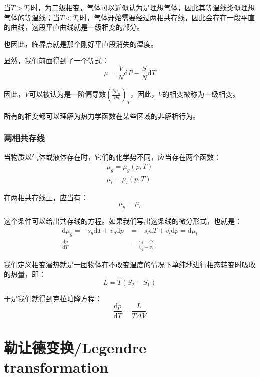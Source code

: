 \documentclass[a4paper, 10pt, openany]{book}%
\begin{document}
当$T>T_c$时，为二级相变，气体可以近似认为是理想气体，因此其等温线类似理想气体的等温线；当$T<T_c$时，气体开始需要经过两相共存线，因此会存在一段平直的曲线，这段平直曲线就是一级相变的部分。

也因此，临界点就是那个刚好平直段消失的温度。

显然，我们前面得到了一个等式：
\begin{equation}
  \mu=\frac{V}{N}\mathrm{d}P-\frac{S}{N}\mathrm{d}T\end{equation}

因此，$V$可以被认为是一阶偏导数$\left(\frac{\partial \mu_n}{\partial p}\right)_T$，因此，$V$的相变被称为一级相变。

所有的相变都可以理解为热力学函数在某些区域的非解析行为。


\subsection{两相共存线}
当物质以气体或液体存在时，它们的化学势不同，应当存在两个函数：
\begin{align}
  \mu_g=\mu_g(p,T)\\
  \mu_l=\mu_l(p,T)
\end{align}

在两相共存线上，应当有：
\begin{equation}
  \mu_g=\mu_l
\end{equation}

这个条件可以给出共存线的方程。如果我们写出这条线的微分形式，也就是：
\begin{align}
  \mathrm{d}\mu_g=-s_g\mathrm{d}T+v_g\mathrm{d}p&=-s_l\mathrm{d}T+v_l\mathrm{d}p=\mathrm{d}\mu_l     \\
  \frac{\mathrm{d}p}{\mathrm{d}T}&=\frac{s_g-s_l}{v_g-v_l}
\end{align}

我们定义相变潜热就是一团物体在不改变温度的情况下单纯地进行相态转变时吸收的热量，即：
\begin{equation}
  L=T(S_2-S_1)
\end{equation}

于是我们就得到克拉珀隆方程：
\begin{equation}
  \frac{\mathrm{d}p}{\mathrm{d}T}=\frac{L}{T\Delta V}
\end{equation}






\newpage
\appendix
\chapter{勒让德变换/Legendre transformation}
\end{document}
